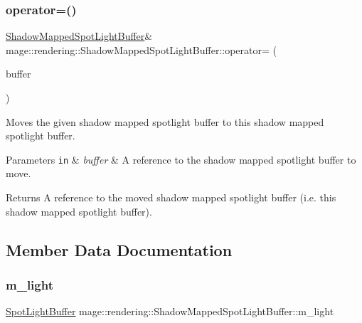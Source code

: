 \subsubsection{\texorpdfstring{operator=()}{operator=()}\hspace{0.1cm}{\footnotesize\ttfamily [2/2]}}
{\footnotesize\ttfamily \mbox{\hyperlink{structmage_1_1rendering_1_1_shadow_mapped_spot_light_buffer}{Shadow\+Mapped\+Spot\+Light\+Buffer}}\& mage\+::rendering\+::\+Shadow\+Mapped\+Spot\+Light\+Buffer\+::operator= (\begin{DoxyParamCaption}\item[{\mbox{\hyperlink{structmage_1_1rendering_1_1_shadow_mapped_spot_light_buffer}{Shadow\+Mapped\+Spot\+Light\+Buffer}} \&\&}]{buffer }\end{DoxyParamCaption})\hspace{0.3cm}{\ttfamily [default]}}

Moves the given shadow mapped spotlight buffer to this shadow mapped spotlight buffer.


\begin{DoxyParams}[1]{Parameters}
\mbox{\tt in}  & {\em buffer} & A reference to the shadow mapped spotlight buffer to move. \\
\hline
\end{DoxyParams}
\begin{DoxyReturn}{Returns}
A reference to the moved shadow mapped spotlight buffer (i.\+e. this shadow mapped spotlight buffer). 
\end{DoxyReturn}


\subsection{Member Data Documentation}
\mbox{\label{structmage_1_1rendering_1_1_shadow_mapped_spot_light_buffer_a1df0d45520394b125e77b806f1b6265d}} 
\subsubsection{\texorpdfstring{m\+\_\+light}{m\_light}}
{\footnotesize\ttfamily \mbox{\hyperlink{structmage_1_1rendering_1_1_spot_light_buffer}{Spot\+Light\+Buffer}} mage\+::rendering\+::\+Shadow\+Mapped\+Spot\+Light\+Buffer\+::m\+\_\+light}

